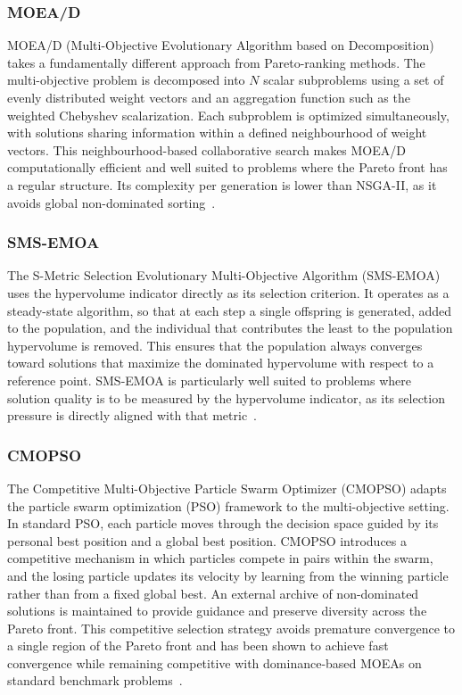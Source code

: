 \subsubsection{MOEA/D}
\label{subsubsec:moead}

MOEA/D (Multi-Objective Evolutionary Algorithm based on Decomposition) takes a fundamentally different approach from Pareto-ranking methods. The
multi-objective problem is decomposed into $N$ scalar subproblems using a set of evenly distributed weight vectors and an aggregation function such as
the weighted Chebyshev scalarization. Each subproblem is optimized simultaneously, with solutions sharing information within a defined neighbourhood
of weight vectors. This neighbourhood-based collaborative search makes MOEA/D computationally efficient and well suited to problems where the Pareto
front has a regular structure. Its complexity per generation is lower than NSGA-II, as it avoids global non-dominated sorting~\cite{moead, pymoo}.

\subsubsection{SMS-EMOA}
\label{subsubsec:smsemoa}

The S-Metric Selection Evolutionary Multi-Objective Algorithm (SMS-EMOA) uses the hypervolume indicator directly as its selection criterion. It
operates as a steady-state algorithm, so that at each step a single offspring is generated, added to the population, and the individual that
contributes the least to the population hypervolume is removed. This ensures that the population always converges toward solutions that maximize the
dominated hypervolume with respect to a reference point. SMS-EMOA is particularly well suited to problems where solution quality is to be measured by
the hypervolume indicator, as its selection pressure is directly aligned with that metric~\cite{smsemoa}.

\subsubsection{CMOPSO}
\label{subsubsec:cmopso}

The Competitive Multi-Objective Particle Swarm Optimizer (CMOPSO) adapts the particle swarm optimization (PSO) framework to the multi-objective
setting. In standard PSO, each particle moves through the decision space guided by its personal best position and a global best position. CMOPSO
introduces a competitive mechanism in which particles compete in pairs within the swarm, and the losing particle updates its velocity by learning from
the winning particle rather than from a fixed global best. An external archive of non-dominated solutions is maintained to provide guidance and
preserve diversity across the Pareto front. This competitive selection strategy avoids premature convergence to a single region of the Pareto front
and has been shown to achieve fast convergence while remaining competitive with dominance-based MOEAs on standard benchmark problems~\cite{cmopso}.




